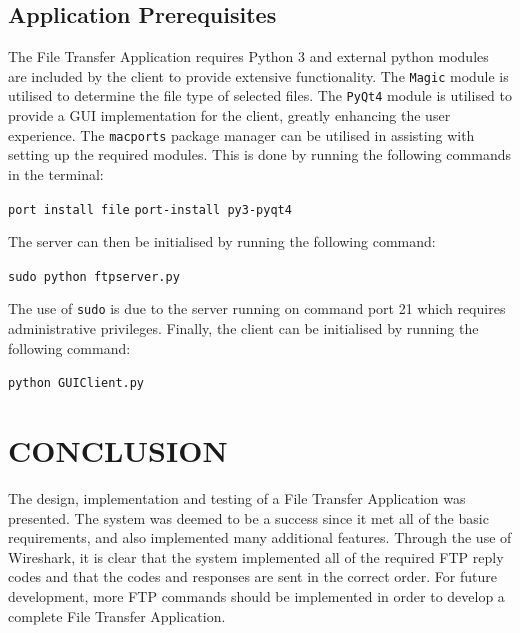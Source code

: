 \documentclass[10pt,twocolumn]{witseiepaper}
\begin{document}
\subsection{Application Prerequisites}
The File Transfer Application requires Python 3 and external python modules are included by the client to provide extensive functionality. The \texttt{Magic} module is utilised  to determine the file type of selected files. The \texttt{PyQt4} module is utilised to provide a GUI implementation for the client, greatly enhancing the user experience. The \texttt{macports} package manager can be utilised in assisting with setting up the required modules. This is done by running the following commands in the terminal:

\texttt{port install file}
\texttt{port-install py3-pyqt4}

The server can then be initialised by running the following command:

\texttt{sudo python ftpserver.py}

The use of \texttt{sudo} is due to the server running on command port 21 which requires administrative privileges. Finally, the client can be initialised by running the following command:

\texttt{python GUIClient.py}

\section{CONCLUSION} \label{sec:conclusion}
The design, implementation and testing of a File Transfer Application was presented. The system was deemed to be a success since it met all of the basic requirements, and also implemented many additional features. Through the use of Wireshark, it is clear that the system implemented all of the required FTP reply codes and that the codes and responses are sent in the correct order. For future development, more FTP commands should be implemented in order to develop a complete File Transfer Application.

%
\balance



\end{document}
